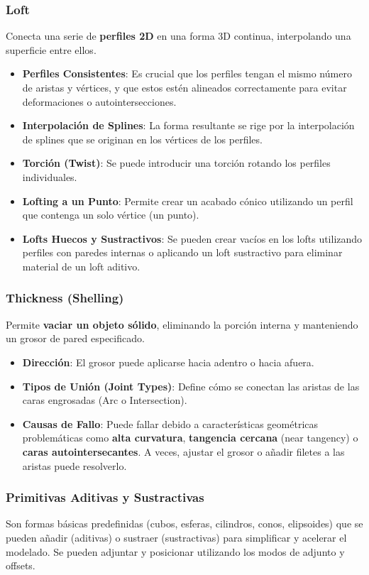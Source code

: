 \documentclass{article}
\begin{document}
\subsubsection*{Loft}
Conecta una serie de \textbf{perfiles 2D} en una forma 3D continua, interpolando una superficie entre ellos.
\begin{itemize}[noitemsep,topsep=0pt]
    \item \textbf{Perfiles Consistentes}: Es crucial que los perfiles tengan el mismo número de aristas y vértices, y que estos estén alineados correctamente para evitar deformaciones o autointersecciones.
    \item \textbf{Interpolación de Splines}: La forma resultante se rige por la interpolación de splines que se originan en los vértices de los perfiles.
    \item \textbf{Torción (Twist)}: Se puede introducir una torción rotando los perfiles individuales.
    \item \textbf{Lofting a un Punto}: Permite crear un acabado cónico utilizando un perfil que contenga un solo vértice (un punto).
    \item \textbf{Lofts Huecos y Sustractivos}: Se pueden crear vacíos en los lofts utilizando perfiles con paredes internas o aplicando un loft sustractivo para eliminar material de un loft aditivo.
\end{itemize}

\subsubsection*{Thickness (Shelling)}
Permite \textbf{vaciar un objeto sólido}, eliminando la porción interna y manteniendo un grosor de pared especificado.
\begin{itemize}[noitemsep,topsep=0pt]
    \item \textbf{Dirección}: El grosor puede aplicarse hacia adentro o hacia afuera.
    \item \textbf{Tipos de Unión (Joint Types)}: Define cómo se conectan las aristas de las caras engrosadas (Arc o Intersection).
    \item \textbf{Causas de Fallo}: Puede fallar debido a características geométricas problemáticas como \textbf{alta curvatura}, \textbf{tangencia cercana} (near tangency) o \textbf{caras autointersecantes}. A veces, ajustar el grosor o añadir filetes a las aristas puede resolverlo.
\end{itemize}

\subsubsection*{Primitivas Aditivas y Sustractivas}
Son formas básicas predefinidas (cubos, esferas, cilindros, conos, elipsoides) que se pueden añadir (aditivas) o sustraer (sustractivas) para simplificar y acelerar el modelado. Se pueden adjuntar y posicionar utilizando los modos de adjunto y offsets.
\end{document}
